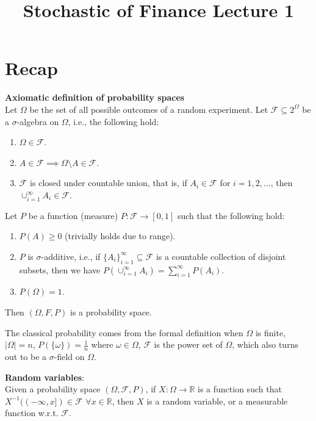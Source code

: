 \documentclass[a4paper]{article}
\title{\textbf{Stochastic of Finance Lecture 1}}
\date{}
\newcommand{\nl}{\vspace{0.2cm}\\}
\renewcommand{\sp}{\vspace{0.2cm}}
\newcommand{\F}{\mathcal{F}}
\newcommand{\R}{\mathbb{R}}
\begin{document}
\maketitle
\tableofcontents

\section{Recap}
\begin{defn}
    \textbf{Axiomatic definition of probability spaces}\nl
    Let $\Omega$ be the set of all possible outcomes of a random experiment. Let $\F \subseteq 2^\Omega$ be a $\sigma$-algebra on $\Omega$, i.e., the following hold:

    \begin{enumerate}
        \item $\Omega \in \F$.
        \item $A \in \F \implies \Omega \setminus A \in \F$.
        \item $\F$ is closed under countable union, that is, if $A_i \in \F$ for $i = 1, 2, \ldots$, then $\cup_{i=1}^\infty A_i \in \F$.
    \end{enumerate}

    Let $P$ be a function (measure) $P : \F \to [0, 1]$ such that the following hold:

    \begin{enumerate}
        \item $P(A) \ge 0$ (trivially holds due to range).
        \item $P$ is $\sigma$-additive, i.e., if $\{A_i\}_{i=1}^\infty \subseteq \F$ is a countable collection of disjoint subsets, then we have $P(\cup_{i=1}^\infty A_i) = \sum_{i=1}^\infty P(A_i)$.
        \item $P(\Omega) = 1$.
    \end{enumerate}

    Then $(\Omega, F, P)$ is a probability space.
\end{defn}
\sp
The classical probability comes from the formal definition when $\Omega$ is finite, $|\Omega| = n$, $P(\{\omega\}) = \frac{1}{n}$ where $\omega \in \Omega$, $\F$ is the power set of $\Omega$,
which also turns out to be a $\sigma$-field on $\Omega$.\nl

\begin{defn}
    \textbf{Random variables}:\nl
    Given a probability space $(\Omega, \F, P)$, if $X : \Omega \to \R$ is a function such that $X^{-1}((-\infty, x]) \in \F$ $\forall x \in \R$, then $X$ is a random variable, or a
    measurable function w.r.t. $\F$.
\end{defn}
\end{document}
